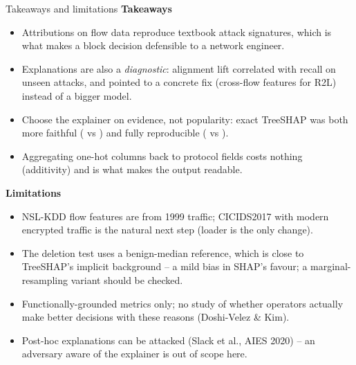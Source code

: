 \documentclass[10pt,aspectratio=169]{beamer}
\begin{document}
\begin{frame}{Takeaways and limitations}
\small
\textbf{Takeaways}
\begin{itemize}\itemsep2pt
  \item Attributions on flow data reproduce textbook attack signatures, which is
        what makes a block decision defensible to a network engineer.
  \item Explanations are also a \emph{diagnostic}: alignment lift correlated
        \corrAlign{} with recall on unseen attacks, and pointed to a concrete fix
        (cross-flow features for R2L) instead of a bigger model.
  \item Choose the explainer on evidence, not popularity: exact TreeSHAP was
        both more faithful (\aopcShap{} vs \aopcLime) and fully reproducible
        (\stabShap{} vs \stabLime).
  \item Aggregating one-hot columns back to protocol fields costs nothing
        (additivity) and is what makes the output readable.
\end{itemize}
\vspace{0.4em}
\textbf{Limitations}
\begin{itemize}\itemsep2pt
  \item NSL-KDD flow features are from 1999 traffic; CICIDS2017 with modern
        encrypted traffic is the natural next step (loader is the only change).
  \item The deletion test uses a benign-median reference, which is close to
        TreeSHAP's implicit background -- a mild bias in SHAP's favour; a
        marginal-resampling variant should be checked.
  \item Functionally-grounded metrics only; no study of whether operators
        actually make better decisions with these reasons (Doshi-Velez \& Kim).
  \item Post-hoc explanations can be attacked (Slack et al., AIES 2020) --
        an adversary aware of the explainer is out of scope here.
\end{itemize}
\end{frame}
\end{document}
